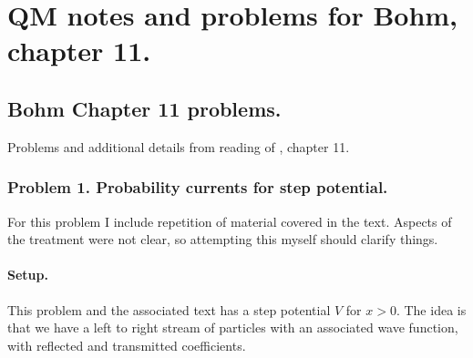 
%
%




\chapter{QM notes and problems for Bohm, chapter 11. }
\label{chap:bohm11}
\date{ May 8, 2009.   bohm11.tex }

%

\section{Bohm Chapter 11 problems. }

Problems and additional details from reading of \citep{bohm1989qt}, chapter 11.

\subsection{Problem 1.  Probability currents for step potential. }

For this problem I include repetition of material covered in the text.
Aspects of the treatment were not clear, so attempting this myself
should clarify things.

\subsubsection{Setup. }

This problem and the associated text has a step potential $V$ for $x>0$.  The
idea is that we have a left to right stream of particles with an associated
wave function, with reflected and transmitted coefficients.

